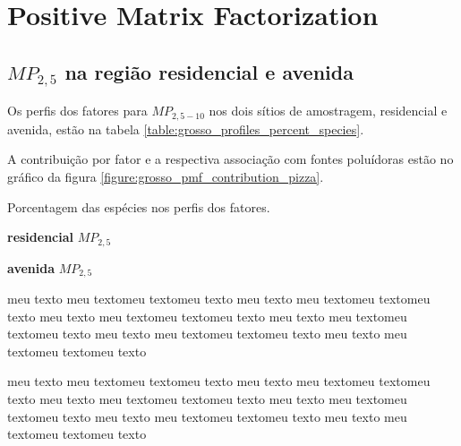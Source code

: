 \section{Positive Matrix Factorization}


\subsection{$MP_{2,5}$ na região residencial e avenida}

Os perfis dos fatores para $MP_{2,5-10}$ nos dois sítios de amostragem, 
residencial e avenida, estão na tabela \ref{table:grosso_profiles_percent_species}.

A contribuição por fator e a respectiva associação com fontes poluídoras
estão no gráfico da figura \ref{figure:grosso_pmf_contribution_pizza}. 

\begin{table}[H]%
  \begin{scriptsize} 
    \caption{Porcentagem das espécies nos perfis dos fatores.
    \label{table:grosso_profiles_percent_species}}


    \begin{subtable}{.4\textwidth}
      \centering

        \caption{\textbf{residencial} $MP_{2,5}$ \label{table:RGsH_profiles_percent_species}}
        
    \end{subtable}%

  
    \begin{subtable}{.4\linewidth}
      \centering

        \caption{\textbf{avenida}  $MP_{2,5}$\label{table:TGsH_profiles_percent_species}}
        
    \end{subtable} 


  \end{scriptsize} 
\end{table}

 meu texto meu textomeu textomeu texto meu texto meu textomeu textomeu texto meu texto meu textomeu textomeu texto meu texto meu textomeu textomeu texto meu texto meu textomeu textomeu texto meu texto meu textomeu textomeu texto

 meu texto meu textomeu textomeu texto meu texto meu textomeu textomeu texto meu texto meu textomeu textomeu texto meu texto meu textomeu textomeu texto meu texto meu textomeu textomeu texto meu texto meu textomeu textomeu texto








